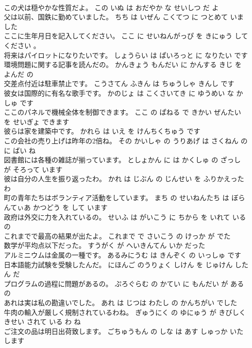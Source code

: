 \documentclass[8pt]{extreport}
\begin{document}
\begin{CJK}{UTF8}{min}
\\	この犬は穏やかな性質だよ。	この いぬ は おだやか な せいしつ だ よ 
\\	父は以前、国鉄に勤めていました。	ちち は いぜん こくてつ に つとめて いました 
\\	ここに生年月日を記入してください。	ここ に せいねんがっぴ を きにゅう して ください 。 
\\	将来はパイロットになりたいです。	しょうらい は ぱいろっと に なりたい です 
\\	環境問題に関する記事を読んだの。	かんきょう もんだい に かんする きじ を よんだ の 
\\	交差点付近は駐車禁止です。	こうさてん ふきん は ちゅうしゃ きんし です 
\\	彼女は国際的に有名な歌手です。	かのじょ は こくさいてき に ゆうめい な かしゅ です 
\\	ここのパネルで機械全体を制御できます。	ここ の ぱねる で きかい ぜんたい を せいぎょ できます 
\\	彼らは家を建築中です。	かれら は いえ を けんちくちゅう です 
\\	この会社の売り上げは昨年の2倍ね。	その かいしゃ の うりあげ は さくねん の に ばい ね 
\\	図書館には各種の雑誌が揃っています。	としょかん に は かくしゅ の ざっし が そろって います 
\\	彼は自分の人生を振り返ったわ。	かれ は じぶん の じんせい を ふりかえった わ 
\\	町の青年たちはボランティア活動をしています。	まち の せいねんたち は ぼらんてぃあ かつどう を して います 
\\	政府は外交に力を入れているの。	せいふ は がいこう に ちから を いれて いる の 
\\	これまでで最高の結果が出たよ。	これまで で さいこう の けっか が でた 
\\	数学が平均点以下だった。	すうがく が へいきんてん いか だった 
\\	アルミニウムは金属の一種です。	あるみにうむ は きんぞく の いっしゅ です 
\\	日本語能力試験を受験したんだ。	にほんご のうりょく しけん を じゅけん した ん だ 
\\	プログラムの過程に問題があるの。	ぷろぐらむ の かてい に もんだい が ある の 
\\	あれは実は私の勘違いでした。	あれ は じつは わたし の かんちがい でした 
\\	牛肉の輸入が厳しく規制されているわね。	ぎゅうにく の ゆにゅう が きびしく きせい されて いる わ ね 
\\	ご注文の品は明日出荷致します。	ごちゅうもん の しな は あす しゅっか いたします 

\end{CJK}
\end{document}
